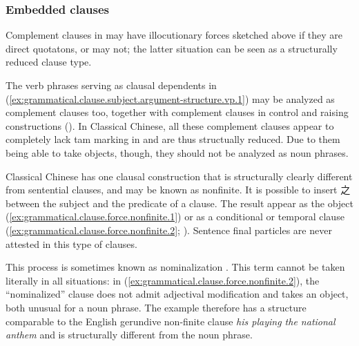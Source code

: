 \documentclass[UTF8, a4paper, oneside, scheme=plain, 12pt]{ctexrep}
\newcommand*{\citepage}[1]{p.~{#1}}
\newcommand{\form}[1]{\emph{#1}}
\begin{document}
\subsubsection{Embedded clauses}\label{sec:grammatical.clause.force.nonfinite}

Complement clauses in  may have illocutionary forces sketched above if they are direct quotatons, or may not; the latter situation can be seen as a structurally reduced clause type. 

The verb phrases serving as clausal dependents in (\ref{ex:grammatical.clause.subject.argument-structure.vp.1}) may be analyzed as complement clauses too,
together with complement clauses in control and raising constructions ().
In Classical Chinese, all these complement clauses appear to completely lack \ac{tam} marking in  and are thus structually reduced.
Due to them being able to take objects, though, they should not be analyzed as noun phrases.

Classical Chinese has one clausal construction that is structurally clearly different from sentential clauses, and may be known as nonfinite.
It is possible to insert 之 between the subject and the predicate of a clause.
The result appear as the object
(\ref{ex:grammatical.clause.force.nonfinite.1})
or as a conditional or temporal clause
(\ref{ex:grammatical.clause.force.nonfinite.2}; ).
Sentence final particles are never attested in this type of clauses.

This process is sometimes known as nominalization \citep[\citepage{64}]{pulleyblank1995outline}.
This term cannot be taken literally in all situations:
in (\ref{ex:grammatical.clause.force.nonfinite.2}), the ``nominalized'' clause does not admit adjectival modification
and takes an object, both unusual for a noun phrase.
The example therefore has a structure comparable to the English gerundive non-finite clause \form{his playing the national anthem}
and is structurally different from the noun phrase.
\end{document}
